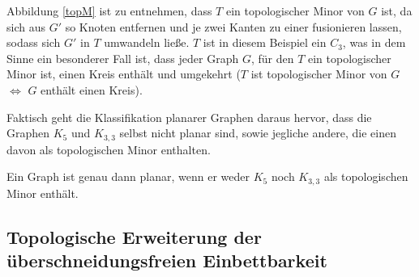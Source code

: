 Abbildung \ref{topM} ist zu entnehmen, dass $T$ ein topologischer Minor von $G$ ist, da sich aus $G'$ so Knoten entfernen und je zwei Kanten zu einer fusionieren lassen, sodass sich $G'$ in $T$ umwandeln ließe. $T$ ist in diesem Beispiel ein $C_3$, was in dem Sinne ein besonderer Fall ist, dass jeder Graph $G$, für den $T$ ein topologischer Minor ist, einen Kreis enthält und umgekehrt ($T$ ist topologischer Minor von $G$ $\Leftrightarrow$ $G$ enthält einen Kreis).

Faktisch geht die Klassifikation planarer Graphen daraus hervor, dass die Graphen $K_{5}$ und $K_{3,3}$ selbst nicht planar sind, sowie jegliche andere, die einen davon als topologischen Minor enthalten. %
\begin{satz}[Kuratowski] Ein Graph ist genau dann planar, wenn er weder  $K_{5}$ noch $K_{3,3}$ als topologischen Minor enthält. \end{satz}

\subsection{Topologische Erweiterung der überschneidungsfreien Einbettbarkeit}


